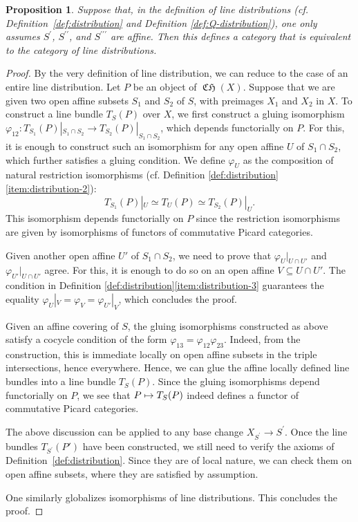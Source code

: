 \documentclass[11pt]{article}
\newcommand{\cf}{cf.\xspace}
\newcommand\mto{\mathchoice{\longmapsto}{\mapsto}{\mapsto}{\mapsto}}
\theoremstyle{plain}
\newtheorem{proposition}[theorem]{Proposition}
\theoremstyle{definition}
\DeclareMathOperator{\CHfrak}{\mathfrak{CH}}
\begin{document}
\begin{proposition}\label{prop:line-distribution-affine}
Suppose that, in the definition of line distributions (\cf Defini\-tion~\ref{def:distribution} and Definition \ref{def:Q-distribution}), one only assumes $S^{\prime}$, $S^{\prime\prime}$, and $S^{\prime\prime\prime}$ are affine. Then this defines a category that is equivalent to the category of line distributions.
\end{proposition}

\begin{proof}
By the very definition of line distribution, we can reduce to the case of an entire line distribution. Let $P$ be an object of $\CHfrak(X)$. Suppose that we are given two open affine subsets $S_1$ and $S_2$ of $S$, with preimages $X_{1}$ and $X_{2}$ in $X$. To construct a line bundle $T_{S}(P)$ over $X$, we first construct a gluing isomorphism $\varphi_{12}: T_{S_{1}}(P)|_{S_{1}\cap S_{2}} \to T_{S_2}(P)|_{S_{1}\cap S_{2}}$, which depends functorially on $P$. For this, it is enough to construct such an isomorphism for any open affine $U$ of $S_{1} \cap S_{2}$, which further satisfies a gluing condition. We define $\varphi_U$ as the composition of natural restriction isomorphisms (\cf Definition \ref{def:distribution}\eqref{item:distribution-2}):\vspace*{-3pt}
\begin{displaymath}
T_{S_1}(P)|_U \simeq T_{U}(P) \simeq T_{S_2}(P)|_U.
\end{displaymath}
This isomorphism depends functorially on $P$ since the restriction isomorphisms are given by isomorphisms of functors of commutative Picard categories.

Given another open affine $U'$ of $S_{1} \cap S_{2}$, we need to prove that $\varphi_{U}|_{U \cap U'}$ and $\varphi_{U'}|_{U \cap U'}$ agree. For this, it is enough to do so on an open affine $V \subseteq U \cap U'$. The condition in Definition \ref{def:distribution}\eqref{item:distribution-3} guarantees the equality $\varphi_U|_V = \varphi_V = \varphi_{U'}|_V$, which concludes the proof.

Given an affine covering of $S$, the gluing isomorphisms constructed as above satisfy a cocycle condition of the form $\varphi_{13} = \varphi_{12} \varphi_{23}$. Indeed, from the construction, this is immediate locally on open affine subsets in the triple intersections, hence everywhere. Hence, we can glue the affine locally defined line bundles into a line bundle $T_{S}(P)$. Since the gluing isomorphisms depend functorially on $P$, we see that $P\mto T_{S}(P)$ indeed defines a functor of commutative Picard categories.

The above discussion can be applied to any base change $X_{S^{\prime}}\to S^{\prime}$. Once the line bundles $T_{S^{\prime}}(P')$ have been constructed, we still need to verify the axioms of Definition~\ref{def:distribution}. Since they are of local nature, we can check them on open affine subsets, where they are satisfied by assumption.

One similarly globalizes isomorphisms of line distributions. This concludes the proof.
\end{proof}
\end{document}
